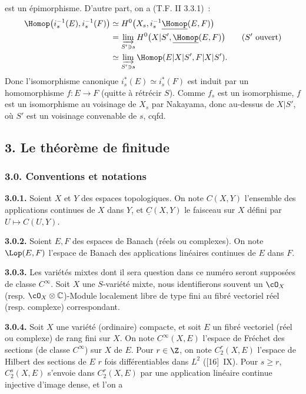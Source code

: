 est un
épimorphisme. D'autre part, on a (T.F. II 3.3.1)~:
\[
\begin{aligned}
  \Homop\bigl(i_s^{-1}(E),i_s^{-1}(F)\bigr)
  &\simeq H^0\bigl(X_s,i_s^{-1}\underline{\Homop}(E,F)\bigr)\\
  &=\varinjlim_{S'\ni s} H^0\bigl(X|S',\underline{\Homop}(E,F)\bigr)\qquad (S'\ \text{ouvert})\\
  &\simeq \varinjlim_{S'\ni s}\Homop(E|X|S',F|X|S').
\end{aligned}
\]
Donc l'isomorphisme canonique $i_s^*(E)\simeq i_s^*(F)$ est induit par un homomorphisme $f:E\to F$ (quitte à rétrécir $S$). Comme $f_s$ est un isomorphisme, $f$ est un isomorphisme au voisinage de $X_s$ par Nakayama, donc au-dessus de $X|S'$, où $S'$ est un voisinage convenable de $s$, cqfd.

\subsection*{3. Le théorème de finitude}

\subsubsection*{3.0. Conventions et notations}
\textbf{3.0.1.} Soient $X$ et $Y$ des espaces topologiques. On note $C(X,Y)$ l'ensemble des applications continues de $X$ dans $Y$, et $\underline C(X,Y)$ le faisceau sur $X$ défini par $U\mapsto C(U,Y)$.

\textbf{3.0.2.} Soient $E,F$ des espaces de Banach (réels ou complexes). On note $\Lop(E,F)$ l'espace de Banach des applications linéaires continues de $E$ dans $F$.

\textbf{3.0.3.} Les variétés mixtes dont il sera question dans ce numéro seront supposées de classe $C^\infty$. Soit $X$ une $S$-variété mixte, nous identifierons souvent un $\cO_X$ (resp. $\cO_X\otimes\mathbb C$)-Module localement libre de type fini au fibré vectoriel réel (resp. complexe) correspondant.

\textbf{3.0.4.} Soit $X$ une variété (ordinaire) compacte, et soit $E$ un fibré vectoriel (réel ou complexe) de rang fini sur $X$. On note $C^\infty(X,E)$ l'espace de Fréchet des sections (de classe $C^\infty$) sur $X$ de $E$. Pour $r\in\Z$, on note $C^r_2(X,E)$ l'espace de Hilbert des sections de $E$ $r$ fois différentiables dans $L^2$ ([16]~IX). Pour $s\ge r$, $C^s_2(X,E)$ s'envoie dans $C^r_2(X,E)$ par une application linéaire continue injective d'image dense, et l'on a 
